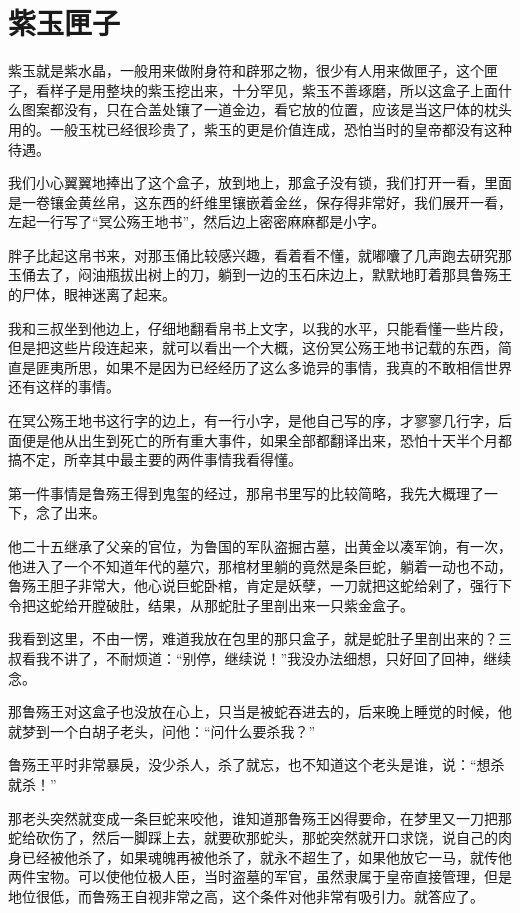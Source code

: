 \chapter{紫玉匣子}

紫玉就是紫水晶，一般用来做附身符和辟邪之物，很少有人用来做匣子，这个匣子，看样子是用整块的紫玉挖出来，十分罕见，紫玉不善琢磨，所以这盒子上面什么图案都没有，只在合盖处镶了一道金边，看它放的位置，应该是当这尸体的枕头用的。一般玉枕已经很珍贵了，紫玉的更是价值连成，恐怕当时的皇帝都没有这种待遇。

我们小心翼翼地捧出了这个盒子，放到地上，那盒子没有锁，我们打开一看，里面是一卷镶金黄丝帛，这东西的纤维里镶嵌着金丝，保存得非常好，我们展开一看，左起一行写了“冥公殇王地书”，然后边上密密麻麻都是小字。

胖子比起这帛书来，对那玉俑比较感兴趣，看着看不懂，就嘟囔了几声跑去研究那玉俑去了，闷油瓶拔出树上的刀，躺到一边的玉石床边上，默默地盯着那具鲁殇王的尸体，眼神迷离了起来。

我和三叔坐到他边上，仔细地翻看帛书上文字，以我的水平，只能看懂一些片段，但是把这些片段连起来，就可以看出一个大概，这份冥公殇王地书记载的东西，简直是匪夷所思，如果不是因为已经经历了这么多诡异的事情，我真的不敢相信世界还有这样的事情。

在冥公殇王地书这行字的边上，有一行小字，是他自己写的序，才寥寥几行字，后面便是他从出生到死亡的所有重大事件，如果全部都翻译出来，恐怕十天半个月都搞不定，所幸其中最主要的两件事情我看得懂。

第一件事情是鲁殇王得到鬼玺的经过，那帛书里写的比较简略，我先大概理了一下，念了出来。

他二十五继承了父亲的官位，为鲁国的军队盗掘古墓，出黄金以凑军饷，有一次，他进入了一个不知道年代的墓穴，那棺材里躺的竟然是条巨蛇，躺着一动也不动，鲁殇王胆子非常大，他心说巨蛇卧棺，肯定是妖孽，一刀就把这蛇给剁了，强行下令把这蛇给开膛破肚，结果，从那蛇肚子里剖出来一只紫金盒子。

我看到这里，不由一愣，难道我放在包里的那只盒子，就是蛇肚子里剖出来的？三叔看我不讲了，不耐烦道：“别停，继续说！”我没办法细想，只好回了回神，继续念。

那鲁殇王对这盒子也没放在心上，只当是被蛇吞进去的，后来晚上睡觉的时候，他就梦到一个白胡子老头，问他：“问什么要杀我？”

鲁殇王平时非常暴戾，没少杀人，杀了就忘，也不知道这个老头是谁，说：“想杀就杀！”

那老头突然就变成一条巨蛇来咬他，谁知道那鲁殇王凶得要命，在梦里又一刀把那蛇给砍伤了，然后一脚踩上去，就要砍那蛇头，那蛇突然就开口求饶，说自己的肉身已经被他杀了，如果魂魄再被他杀了，就永不超生了，如果他放它一马，就传他两件宝物。可以使他位极人臣，当时盗墓的军官，虽然隶属于皇帝直接管理，但是地位很低，而鲁殇王自视非常之高，这个条件对他非常有吸引力。就答应了。

